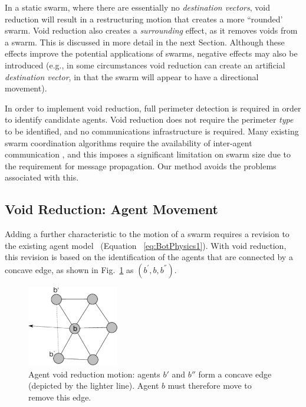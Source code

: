 \documentclass[letterpaper]{article}
\begin{document}
In a static swarm, where there are essentially no \textit{destination vectors}, void reduction will result in a restructuring motion that creates a more  ``rounded' swarm. Void reduction also creates a {\it surrounding} effect, as it removes voids from a swarm. This is discussed in more detail in the next Section.  Although these effects improve the potential applications of swarms, negative effects may also be introduced (e.g., in some circumstances void reduction can create an artificial \textit{destination vector}, in that the swarm will appear to have a directional movement). 

In order to implement void reduction, full perimeter detection is required in order to identify candidate agents. Void reduction does not require the perimeter {\it type} to be identified,  and no communications infrastructure is required. Many existing swarm coordination algorithms require the availability of inter-agent communication \citep{JG:13,MD:09,SOM:12,NIM:09,ZFG:13}, and this imposes a significant limitation on swarm size due to the requirement for message propagation. Our method avoids the problems associated with this.

\subsection{Void Reduction: Agent Movement}\label{concave:AgentMovement}

Adding a further characteristic to the motion of a swarm requires a revision to the existing agent model ~(Equation ~\ref{eq:BotPhysics1}). With void reduction, this revision is based on the identification of the agents that are connected by a concave edge, as shown in Fig.~\ref{concave:VoidConcave1} as $(b^{'},b,b^{''})$. 

\begin{figure}
\begin{center}
\includegraphics[width=4cm]{figures/VoidConcave1}
\end{center}
\caption{Agent void reduction motion: agents $b'$ and $b''$ form a concave edge (depicted by the lighter line). Agent $b$ must therefore move to remove this edge. \label{concave:VoidConcave1}}
\end{figure}
\end{document}
